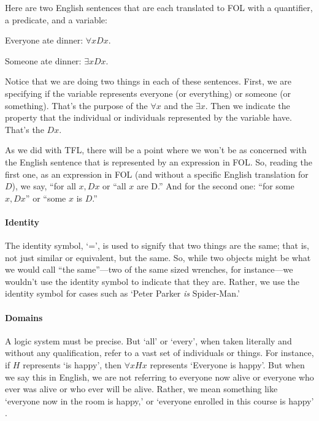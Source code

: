 Here are two English sentences that are each translated to FOL with a quantifier, a predicate, and a variable:
\begin{ebullet}
	\item[] Everyone ate dinner: $\forall x Dx$. 
	\item[] Someone ate dinner: $\exists x Dx$.
\end{ebullet}
Notice that we are doing two things in each of these sentences. First, we are specifying if the variable represents everyone (or everything) or someone (or something). That's the purpose of the $\forall x$ and the $\exists x$. Then we indicate the property that the individual or individuals represented by the variable have. That's the $Dx$.

As we did with TFL, there will be a point where we won’t be as concerned with the English sentence that is represented by an expression in FOL. So, reading the first one, as an expression in FOL (and without a specific English translation for $D$), we say, ``for all $x, Dx$ or ``all $x$ are D.'' And for the second one: ``for some $x, Dx$'' or ``some $x$ is $D$.'' 


\paragraph{Identity}

The identity symbol, `=’, is used to signify that two things are the same; that is, not just similar or equivalent, but the same. So, while two objects might be what we would call ``the same''---two of the same sized wrenches, for instance---we wouldn't use the identity symbol to indicate that they are. Rather, we use the identity symbol for cases such as `Peter Parker \textit{is} Spider-Man.’ 


\paragraph{Domains}

A logic system must be precise. But `all’ or `every’, when taken literally and without any qualification, refer to a vast set of individuals or things. For instance, if $H$ represents `is happy’, then $\forall x Hx$ represents ‘Everyone is happy’. But when we say this in English, we are not referring to everyone now alive or everyone who ever was alive or who ever will be alive. Rather, we mean something like `everyone now in the room is happy,’ or `everyone enrolled in this course is happy’ {\libser \Large{}}.
 

